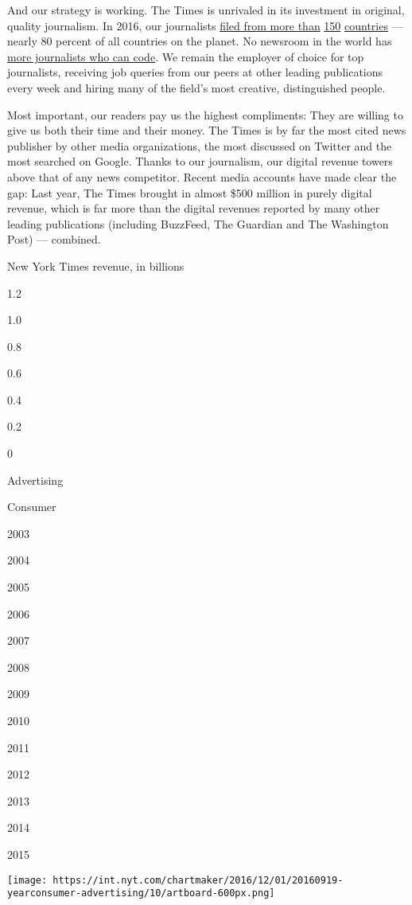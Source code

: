 And our strategy is working. The Times is unrivaled in its investment in
original, quality journalism. In 2016, our journalists
\href{https://www.nytimes.com/2016/12/17/world/we-were-there.html}{filed
from more than}
\href{https://www.nytimes.com/2016/12/17/world/we-were-there.html}{150}
\href{https://www.nytimes.com/2016/12/17/world/we-were-there.html}{countries}
--- nearly 80 percent of all countries on the planet. No newsroom in the
world has
\href{https://www.nytimes.com/interactive/2016/12/28/us/year-in-interactive-graphics.html}{more
journalists who can code}. We remain the employer of choice for top
journalists, receiving job queries from our peers at other leading
publications every week and hiring many of the field's most creative,
distinguished people.

Most important, our readers pay us the highest compliments: They are
willing to give us both their time and their money. The Times is by far
the most cited news publisher by other media organizations, the most
discussed on Twitter and the most searched on Google. Thanks to our
journalism, our digital revenue towers above that of any news
competitor. Recent media accounts have made clear the gap: Last year,
The Times brought in almost \$500 million in purely digital revenue,
which is far more than the digital revenues reported by many other
leading publications (including BuzzFeed, The Guardian and The
Washington Post) --- combined.

New York Times revenue, in billions

1.2

1.0

0.8

0.6

0.4

0.2

0

Advertising

Consumer

2003

2004

2005

2006

2007

2008

2009

2010

2011

2012

2013

2014

2015

\texttt{[image: https://int.nyt.com/chartmaker/2016/12/01/20160919-yearconsumer-advertising/10/artboard-600px.png]}

